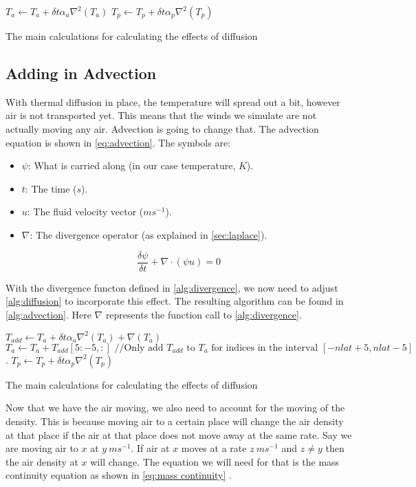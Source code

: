 \begin{algorithm}
    $T_a \leftarrow T_a + \delta t \alpha_a \nabla^2(T_a)$ \;
    $T_p \leftarrow T_p + \delta t \alpha_p \nabla^2(T_p)$ \;
    \caption{The main calculations for calculating the effects of diffusion}
    \label{alg:diffusion}
\end{algorithm}

\subsection{Adding in Advection}
With thermal diffusion in place, the temperature will spread out a bit, however air is not transported yet. This means that the winds we simulate are not actually moving any air. Advection is
going to change that. The advection equation is shown in \autoref{eq:advection}. The symbols are:

\begin{itemize}
    \item $\psi$: What is carried along (in our case temperature, $K$).
    \item $t$: The time ($s$).
    \item $u$: The fluid velocity vector ($ms^{-1}$).
    \item $\nabla$: The divergence operator (as explained in \autoref{sec:laplace}).
\end{itemize}

\begin{equation}
    \frac{\delta \psi}{\delta t} + \nabla \cdot (\psi u) = 0
    \label{eq:advection}
\end{equation}

With the divergence functon defined in \autoref{alg:divergence}, we now need to adjust \autoref{alg:diffusion} to incorporate this effect. The resulting algorithm can be found in 
\autoref{alg:advection}. Here $\nabla$ represents the function call to \autoref{alg:divergence}.

\begin{algorithm}
    $T_{add} \leftarrow T_a + \delta t \alpha_a \nabla^2(T_a) + \nabla(T_a)$ \;
    $T_a \leftarrow T_a + T_{add}[5:-5, :] \text{ //Only add } T_{add} \text{ to } T_a \text{ for indices in the interval } [-nlat + 5, nlat - 5]$. \;
    $T_p \leftarrow T_p + \delta t \alpha_p \nabla^2(T_p)$ \;
    \caption{The main calculations for calculating the effects of diffusion}
    \label{alg:advection}
\end{algorithm}

Now that we have the air moving, we also need to account for the moving of the density. This is because moving air to a certain place will change the air density at that place if the air at that 
place does not move away at the same rate. Say we are moving air to $x$ at $y \ ms^{-1}$. If air at $x$ moves at a rate $z \ ms^{-1}$ and $z \neq y$ then the air density at $x$ will change.
The equation we will need for that is the mass continuity equation as shown in \autoref{eq:mass continuity} \cite{masscontinue}.

